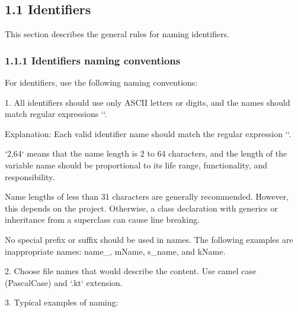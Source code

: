 \subsection*{\textbf{1.1 Identifiers}}

This section describes the general rules for naming identifiers.

\subsubsection*{\textbf{1.1.1 Identifiers naming conventions}}
\leavevmode\newline



For identifiers, use the following naming conventions:

1.	All identifiers should use only ASCII letters or digits, and the names should match regular expressions ``.

Explanation: Each valid identifier name should match the regular expression ``.

`{2,64}` means that the name length is 2 to 64 characters, and the length of the variable name should be proportional to its life range, functionality, and responsibility.

Name lengths of less than 31 characters are generally recommended. However, this depends on the project. Otherwise, a class declaration with generics or inheritance from a superclass can cause line breaking.

No special prefix or suffix should be used in names. The following examples are inappropriate names: name\_, mName, s\_name, and kName.



2.	Choose file names that would describe the content. Use camel case (PascalCase) and `.kt` extension.



3.	Typical examples of naming:



